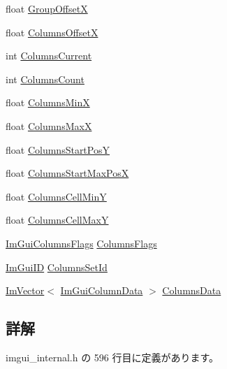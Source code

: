 \begin{DoxyCompactItemize}
\item 
float \mbox{\hyperlink{struct_im_gui_draw_context_a30473e3e4b3eeba6c8d1acdaaedecba9}{Group\+OffsetX}}
\item 
float \mbox{\hyperlink{struct_im_gui_draw_context_af8be098e7ddd1885343725f3fd61ce4a}{Columns\+OffsetX}}
\item 
int \mbox{\hyperlink{struct_im_gui_draw_context_aeeac02b1b1dd8e02e017befff8cf9e34}{Columns\+Current}}
\item 
int \mbox{\hyperlink{struct_im_gui_draw_context_ab068622174203ba86e835980cad066b6}{Columns\+Count}}
\item 
float \mbox{\hyperlink{struct_im_gui_draw_context_ad86d60b4523f423749d944ba56902c83}{Columns\+MinX}}
\item 
float \mbox{\hyperlink{struct_im_gui_draw_context_aa6b05d0a845896193dff628b02f71ba0}{Columns\+MaxX}}
\item 
float \mbox{\hyperlink{struct_im_gui_draw_context_adc5c108aa693534f656018ca095dd2ee}{Columns\+Start\+PosY}}
\item 
float \mbox{\hyperlink{struct_im_gui_draw_context_af1fd970d3806165e93870172231bb1b8}{Columns\+Start\+Max\+PosX}}
\item 
float \mbox{\hyperlink{struct_im_gui_draw_context_a675eb10cf0c56322f8e9a6c40e33a7ea}{Columns\+Cell\+MinY}}
\item 
float \mbox{\hyperlink{struct_im_gui_draw_context_a91c90b98539dc2b1522dd3f7bafa3b21}{Columns\+Cell\+MaxY}}
\item 
\mbox{\hyperlink{imgui_8h_a0edb3053546fcf6c5f7dcb7531c3a17a}{Im\+Gui\+Columns\+Flags}} \mbox{\hyperlink{struct_im_gui_draw_context_acd823cd056a5922a9f3a7c8844451ea7}{Columns\+Flags}}
\item 
\mbox{\hyperlink{imgui_8h_a1785c9b6f4e16406764a85f32582236f}{Im\+Gui\+ID}} \mbox{\hyperlink{struct_im_gui_draw_context_a7bb2cdab76e2b7cc12af2c87eeaafc0a}{Columns\+Set\+Id}}
\item 
\mbox{\hyperlink{class_im_vector}{Im\+Vector}}$<$ \mbox{\hyperlink{struct_im_gui_column_data}{Im\+Gui\+Column\+Data}} $>$ \mbox{\hyperlink{struct_im_gui_draw_context_ae0f7e8f70065e8ddc45d62cf33195a0f}{Columns\+Data}}
\end{DoxyCompactItemize}


\subsection{詳解}


 imgui\+\_\+internal.\+h の 596 行目に定義があります。



